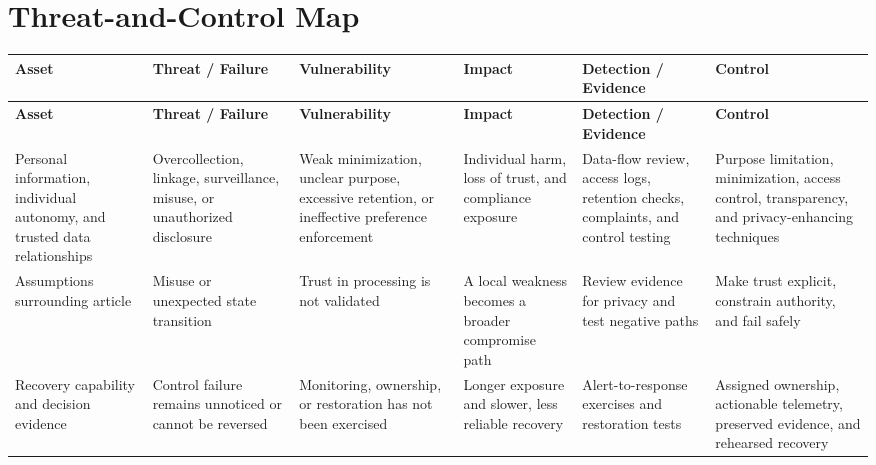 \documentclass[11pt,letterpaper]{article}
\begin{document}
\section*{Threat-and-Control Map}
\begingroup\scriptsize\setlength{\tabcolsep}{2pt}
\begin{longtable}{>{\raggedright\arraybackslash}p{}>{\raggedright\arraybackslash}p{}>{\raggedright\arraybackslash}p{}>{\raggedright\arraybackslash}p{}>{\raggedright\arraybackslash}p{}>{\raggedright\arraybackslash}p{}}
\toprule\rowcolor{Navy}\color{white}\textbf{Asset} & \color{white}\textbf{Threat / Failure} & \color{white}\textbf{Vulnerability} & \color{white}\textbf{Impact} & \color{white}\textbf{Detection / Evidence} & \color{white}\textbf{Control}\\\midrule
\endfirsthead
\toprule\rowcolor{Navy}\color{white}\textbf{Asset} & \color{white}\textbf{Threat / Failure} & \color{white}\textbf{Vulnerability} & \color{white}\textbf{Impact} & \color{white}\textbf{Detection / Evidence} & \color{white}\textbf{Control}\\\midrule
\endhead
Personal information, individual autonomy, and trusted data relationships & Overcollection, linkage, surveillance, misuse, or unauthorized disclosure & Weak minimization, unclear purpose, excessive retention, or ineffective preference enforcement & Individual harm, loss of trust, and compliance exposure & Data-flow review, access logs, retention checks, complaints, and control testing & Purpose limitation, minimization, access control, transparency, and privacy-enhancing techniques\\\midrule
Assumptions surrounding article & Misuse or unexpected state transition & Trust in processing is not validated & A local weakness becomes a broader compromise path & Review evidence for privacy and test negative paths & Make trust explicit, constrain authority, and fail safely\\\midrule
Recovery capability and decision evidence & Control failure remains unnoticed or cannot be reversed & Monitoring, ownership, or restoration has not been exercised & Longer exposure and slower, less reliable recovery & Alert-to-response exercises and restoration tests & Assigned ownership, actionable telemetry, preserved evidence, and rehearsed recovery\\\midrule
\bottomrule
\end{longtable}
\endgroup
\end{document}
